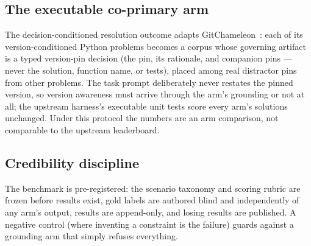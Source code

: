 \subsection{The executable co-primary arm}
The decision-conditioned resolution outcome adapts
GitChameleon~\citep{gitchameleon}: each of its version-conditioned Python
problems becomes a corpus whose governing artifact is a typed version-pin
decision (the pin, its rationale, and companion pins --- never the solution,
function name, or tests), placed among real distractor pins from other
problems. The task prompt deliberately never restates the pinned version, so
version awareness must arrive through the arm's grounding or not at all; the
upstream harness's executable unit tests score every arm's solutions
unchanged. Under this protocol the numbers are an arm comparison, not
comparable to the upstream leaderboard.

\subsection{Credibility discipline}
The benchmark is pre-registered: the scenario taxonomy and scoring rubric are
frozen before results exist, gold labels are authored blind and independently of
any arm's output, results are append-only, and losing results are published. A
negative control (where inventing a constraint is the failure) guards against a
grounding arm that simply refuses everything.
